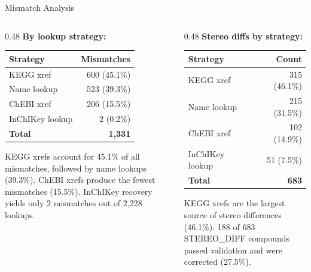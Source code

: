 \documentclass[aspectratio=169,11pt]{beamer}
\begin{document}
\begin{frame}{Mismatch Analysis}

\begin{columns}[T]
\begin{column}{0.48\textwidth}
\textbf{By lookup strategy:}
\begin{table}[h]
\centering
\begin{tabular}{lr}
\toprule
\textbf{Strategy} & \textbf{Mismatches} \\
\midrule
KEGG xref       &   600 (45.1\%) \\
Name lookup     &   523 (39.3\%) \\
ChEBI xref      &   206 (15.5\%) \\
InChIKey lookup &     2 (0.2\%) \\
\midrule
\textbf{Total} & \textbf{1,331} \\
\bottomrule
\end{tabular}
\end{table}

\bigskip
\footnotesize
KEGG xrefs account for 45.1\% of all mismatches, followed by
name lookups (39.3\%). ChEBI xrefs produce the fewest mismatches (15.5\%).
InChIKey recovery yields only 2 mismatches out of 2,228 lookups.
\end{column}

\begin{column}{0.48\textwidth}
\textbf{Stereo diffs by strategy:}
\begin{table}[h]
\centering
\begin{tabular}{lr}
\toprule
\textbf{Strategy} & \textbf{Count} \\
\midrule
KEGG xref       & 315 (46.1\%) \\
Name lookup     & 215 (31.5\%) \\
ChEBI xref      & 102 (14.9\%) \\
InChIKey lookup &  51 (7.5\%) \\
\midrule
\textbf{Total} & \textbf{683} \\
\bottomrule
\end{tabular}
\end{table}

\bigskip
\footnotesize
KEGG xrefs are the largest source of stereo differences (46.1\%).
188 of 683 STEREO\_DIFF compounds passed validation and were corrected (27.5\%).
\end{column}
\end{columns}

\end{frame}
\end{document}
